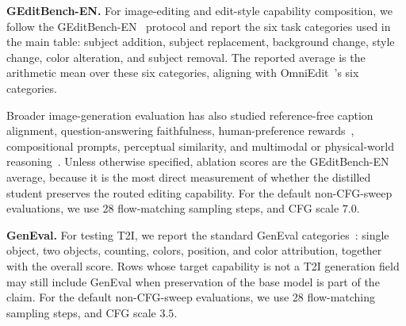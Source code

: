 \documentclass{llmxive}
\begin{document}
\noindent\textbf{GEditBench-EN.}
For image-editing and edit-style capability composition, we follow the GEditBench-EN~\cite{liu2025step1x} protocol and report the six task categories used in the main table: subject addition, subject replacement, background change, style change, color alteration, and subject removal. The reported average is the arithmetic mean over these six categories, aligning with OmniEdit~\cite{wei2025omniedit}'s six categories. 

Broader image-generation evaluation has also studied reference-free caption alignment, question-answering faithfulness, human-preference rewards~\cite{xu2023imagereward,kirstain2023pick,wu2023human}, compositional prompts, perceptual similarity, and multimodal or physical-world reasoning~\cite{hessel2021clipscore,hu2023tifa,huang2025t2i,fu2023dreamsim,chow2025physbench}. Unless otherwise specified, ablation scores are the GEditBench-EN average, because it is the most direct measurement of whether the distilled student preserves the routed editing capability. For the default non-CFG-sweep evaluations, we use 28 flow-matching sampling steps, and CFG scale $7.0$.

\noindent\textbf{GenEval.}
For testing T2I, we report the standard GenEval categories~\cite{ghosh2023geneval}: single object, two objects, counting, colors, position, and color attribution, together with the overall score. Rows whose target capability is not a T2I generation field may still include GenEval when preservation of the base model is part of the claim. For the default non-CFG-sweep evaluations, we use 28 flow-matching sampling steps, and CFG scale $3.5$.
\end{document}

